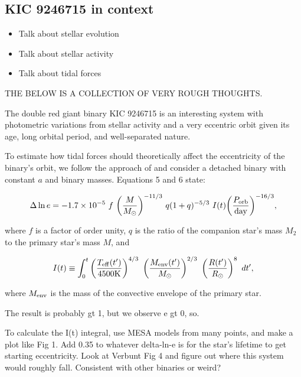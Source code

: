 \subsection{KIC 9246715 in context}\label{context}
\begin{itemize}
\item Talk about stellar evolution
\item Talk about stellar activity
\item Talk about tidal forces
\end{itemize}

THE BELOW IS A COLLECTION OF VERY ROUGH THOUGHTS.

The double red giant binary KIC 9246715 is an interesting system with photometric variations from stellar activity and a very eccentric orbit given its age, long orbital period, and well-separated nature.

To estimate how tidal forces should theoretically affect the eccentricity of the binary's orbit, we follow the approach of \citet{ver95} and consider a detached binary with constant $a$ and binary masses. Equations 5 and 6 \citep{ver95} state:

\begin{equation}\label{tide1}
\Delta \ln e = -1.7 \times 10^{-5} \ f \ {\left( \frac{M}{M_{\odot}} \right)}^{-11/3} \ q(1+q)^{-5/3} \ I(t) {\left( \frac{P_{\rm{orb}}}{\rm{day}} \right)}^{-16/3},
\end{equation}

where $f$ is a factor of order unity, $q$ is the ratio of the companion star's mass $M_2$ to the primary star's mass $M$, and

\begin{equation}
I(t) \equiv \int_0^t \left( \frac{T_{\rm{eff}}(t')}{4500 \rm{K}} \right)^{4/3} \ \left( \frac{M_{\rm{env}}(t')}{M_{\odot}} \right)^{2/3} \ \left( \frac{R(t')}{R_{\odot}} \right)^8 \ dt',
\end{equation}

where $M_{\rm{env}}$ is the mass of the convective envelope of the primary star.

The result is probably gt 1, but we observe e gt 0, so.

To calculate the I(t) integral, use MESA models from many points, and make a plot like Fig 1.
Add 0.35 to whatever delta-ln-e is for the star's lifetime to get starting eccentricity.
Look at Verbunt Fig 4 and figure out where this system would roughly fall. Consistent with other binaries or weird?

